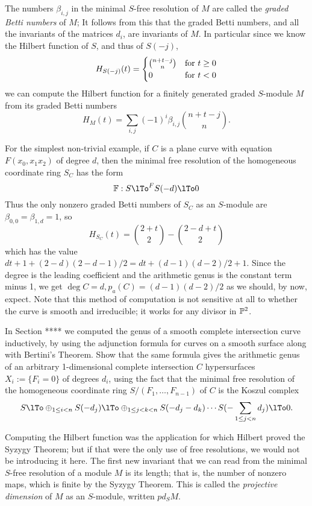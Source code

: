 The numbers $\beta_{i,j}$ in  the minimal $S$-free resolution of $M$ are called the \emph{graded Betti numbers} of $M$; It follows from this that the graded Betti numbers, and all the invariants of the matrices $d_{i}$, are invariants of $M$. In particular since we know the Hilbert function of $S$, and thus of $S(-j)$,
$$
H_{S(-j)}(t) = 
\begin{cases}
 {n+t-j \choose n} & \hbox{for $t\geq 0$}
  \\ 
 0 & \hbox{for $t<0$}
\end{cases}
$$
we can compute the Hilbert function for a finitely generated graded $S$-module $M$ from its graded Betti numbers 
$$
H_{M}(t) = \sum_{i,j} (-1)^{i}\beta_{i,j}{n+t-j\choose n}.
$$
\begin{example}  
For the simplest non-trivial example, if $C$ is a plane curve with equation $F(x_{0},x_{1}x_{2})$ of 
degree $d$, then the minimal free resolution of the homogeneous coordinate ring $S_{C}$ has the form
$$
\FF: S\lTo^{F}S(-d)\lTo 0
$$
Thus the only nonzero graded Betti numbers of $S_{C}$ as an $S$-module are
 $\beta_{0,0} = \beta_{1,d} = 1$, so
$$
 H_{S_{C}}(t) = {2+t\choose 2} - {2-d+t\choose 2}
 $$
 which has the value  $dt + 1+(2-d)(2-d-1)/2 = dt + (d-1)(d-2)/2 +1$. Since the degree is the leading coefficient and the arithmetic genus is the constant term minus 1, we get
$\deg C = d, p_{a}(C) = (d-1)(d-2)/2$ as we should, by now, expect. Note that this method of computation is not sensitive at all to whether the curve is smooth and irreducible; it works for any divisor in $\PP^{2}$.
\end{example}

\begin{exercise} In Section **** we computed the genus of a smooth complete intersection curve inductively, by using the adjunction formula for curves on a smooth surface along with Bertini's Theorem.
Show that the same formula gives the arithmetic genus of an arbitrary 1-dimensional complete intersection $C$ hypersurfaces 
$X_{i} := \{F_{i} = 0\}$ of degrees $d_{i}$,
using the fact that the minimal free resolution of the homogeneous coordinate ring 
$S/(F_{1}, \dots, F_{n-1})$ of $C$  is the Koszul complex
$$
 S \lTo \oplus_{1\leq i<n}S(-d_{j}) \lTo  \oplus_{1\leq j<k<n}S(-d_{j}-d_{k}) \cdots S(-\sum_{1\leq j<n}d_{j})\lTo 0.
 $$
\end{exercise}

Computing the Hilbert function was the application for which Hilbert proved the Syzygy Theorem; but if that were the only use of free resolutions, we would not be introducing it here. The first new invariant that we can read from the minimal $S$-free resolution of a module $M$ is its length; that is, the number of nonzero maps, which is finite by the Syzygy Theorem. This is called the \emph{projective dimension} of $M$ as an $S$-module, written $pd_{S}M$. 

